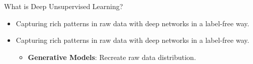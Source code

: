 \begin{frame}[allowframebreaks]{What is Deep Unsupervised Learning?}
\begin{itemize}
\end{itemize}

\framebreak
\begin{itemize}
    \item Capturing rich patterns in raw data with deep networks in a label-free way.
\end{itemize}

\framebreak
\begin{itemize}
    \item Capturing rich patterns in raw data with deep networks in a label-free way.
    \begin{itemize}
        \item \textbf{Generative Models}: Recreate raw data distribution.
    \end{itemize}
\end{itemize}
\end{frame}

